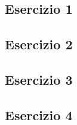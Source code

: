 \subsection{\textbf{Esercizio 1}}
\vspace{0.5cm}

\vspace{1cm}
\subsection{\textbf{Esercizio 2}}
\vspace{0.5cm}

\vspace{1cm}
\subsection{\textbf{Esercizio 3}}
\vspace{0.5cm}

\vspace{1cm}
\subsection{\textbf{Esercizio 4}}
\vspace{0.5cm}

\vspace{1cm}
